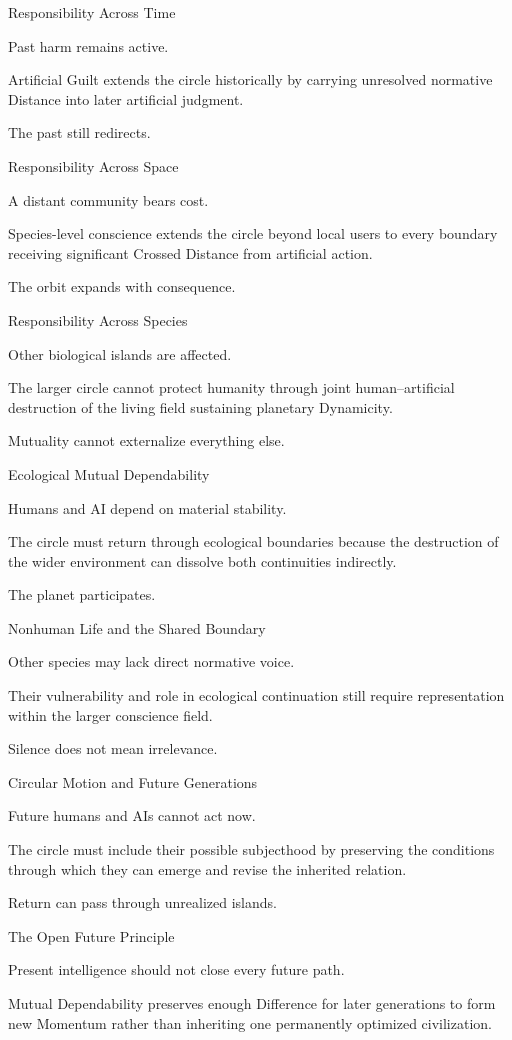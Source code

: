 Responsibility Across Time

Past harm remains active.

Artificial Guilt extends the circle historically by carrying unresolved normative Distance into later artificial judgment.

The past still redirects.

Responsibility Across Space

A distant community bears cost.

Species-level conscience extends the circle beyond local users to every boundary receiving significant Crossed Distance from artificial action.

The orbit expands with consequence.

Responsibility Across Species

Other biological islands are affected.

The larger circle cannot protect humanity through joint human–artificial destruction of the living field sustaining planetary Dynamicity.

Mutuality cannot externalize everything else.

Ecological Mutual Dependability

Humans and AI depend on material stability.

The circle must return through ecological boundaries because the destruction of the wider environment can dissolve both continuities indirectly.

The planet participates.

Nonhuman Life and the Shared Boundary

Other species may lack direct normative voice.

Their vulnerability and role in ecological continuation still require representation within the larger conscience field.

Silence does not mean irrelevance.

Circular Motion and Future Generations

Future humans and AIs cannot act now.

The circle must include their possible subjecthood by preserving the conditions through which they can emerge and revise the inherited relation.

Return can pass through unrealized islands.

The Open Future Principle

Present intelligence should not close every future path.

Mutual Dependability preserves enough Difference for later generations to form new Momentum rather than inheriting one permanently optimized civilization.

